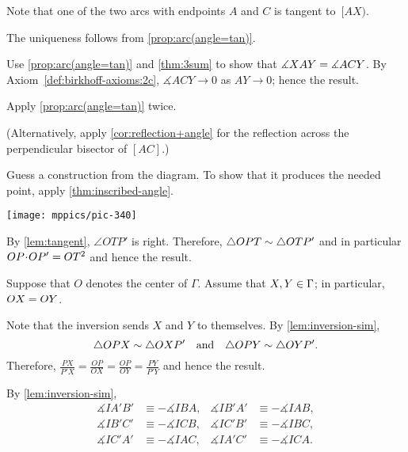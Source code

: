 \begin{multicols}{2}
Note that one of the two arcs with endpoints $A$ and $C$ is tangent to~$[AX)$.

The uniqueness follows from \ref{prop:arc(angle=tan)}.

 Use \ref{prop:arc(angle=tan)} and \ref{thm:3sum} to show that 
$\measuredangle XAY\z=\measuredangle ACY$.
By Axiom~\ref{def:birkhoff-axioms:2c}, $\measuredangle ACY\to 0$ as $AY\to 0$;
hence the result.

Apply \ref{prop:arc(angle=tan)} twice.

(Alternatively, apply \ref{cor:reflection+angle} for the reflection across the perpendicular bisector of $[AC]$.)

 Guess a construction from the diagram.
To show that it produces the needed point, apply \ref{thm:inscribed-angle}.

\begin{Figure}
\vskip-0mm
\centering
\texttt{[image: mppics/pic-340]}
\end{Figure}

\setcounter{eqtn}{0}

By \ref{lem:tangent}, $\angle OTP'$ is right. 
Therefore, $\triangle OPT\z\sim \triangle OTP'$
and in particular
$OP\cdot OP'\z=OT^2$
and hence the result.

Suppose that $O$ denotes the center of $\Gamma$.
Assume that $X,Y\z\in \Gamma$;
in particular, $OX\z=OY$.



Note that the inversion sends $X$ and $Y$ to themselves.
By \ref{lem:inversion-sim},
$$\triangle OPX\z\sim \triangle OXP'
\quad
\text{and}
\quad
\triangle OPY\sim \triangle OYP'.$$
Therefore, 
$\frac{PX}{P'X}=\frac{OP}{OX}=\frac{OP}{OY}=\frac{PY}{P'Y}$
and hence the result.

By \ref{lem:inversion-sim},
\begin{align*}
\measuredangle IA'B'&\equiv -\measuredangle IBA,
&
\measuredangle IB'A'&\equiv -\measuredangle IAB,
\\
\measuredangle IB'C'&\equiv -\measuredangle ICB,
&
\measuredangle IC'B'&\equiv -\measuredangle IBC,
\\
\measuredangle IC'A'&\equiv -\measuredangle IAC,
&
\measuredangle IA'C'&\equiv -\measuredangle ICA.
\end{align*}


\end{multicols}
